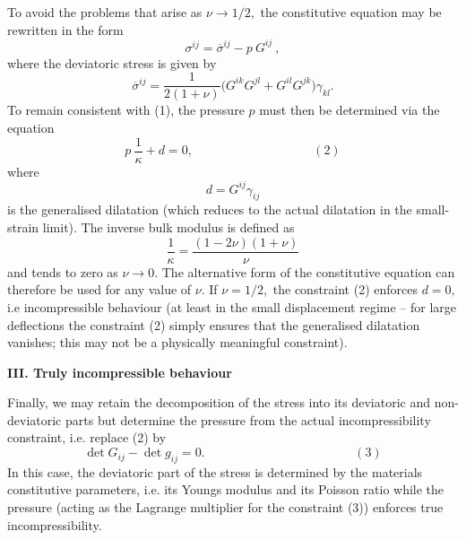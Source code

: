 To avoid the problems that arise as $ \nu \to 1/2, $ the constitutive equation may be rewritten in the form \[ \sigma^{ij} = \overline{\sigma}^{ij} - p \ G^{ij} \ , \] where the deviatoric stress is given by \[ \overline{\sigma}^{ij} = \frac{1}{2(1+\nu)} \bigg( G^{ik} G^{jl} + G^{il} G^{jk} \bigg) \gamma_{kl}. \] To remain consistent with (1), the pressure $ p $ must then be determined via the equation \[ p \ \frac{1}{\kappa} + d = 0, \hspace{4cm} (2) \] where \[ d = G^{ij} \gamma_{ij} \] is the generalised dilatation (which reduces to the actual dilatation in the small-\/strain limit). The inverse bulk modulus is defined as \[ \frac{1}{\kappa} = \frac{(1-2\nu)(1+\nu)}{\nu} \] and tends to zero as $ \nu \to 0. $ The alternative form of the constitutive equation can therefore be used for any value of $ \nu $. If $ \nu = 1/2, $ the constraint (2) enforces $ d=0, $ i.\+e incompressible behaviour (at least in the small displacement regime -- for large deflections the constraint (2) simply ensures that the generalised dilatation vanishes; this may not be a physically meaningful constraint).

{\bfseries  I\+II. Truly incompressible behaviour}

Finally, we may retain the decomposition of the stress into its deviatoric and non-\/deviatoric parts but determine the pressure from the actual incompressibility constraint, i.\+e. replace (2) by \[ \det G_{ij} - \det g_{ij} = 0. \hspace{5cm} (3) \] In this case, the deviatoric part of the stress is determined by the material\textquotesingle{}s constitutive parameters, i.\+e. its Young\textquotesingle{}s modulus and its Poisson ratio while the pressure (acting as the Lagrange multiplier for the constraint (3)) enforces true incompressibility.

\label{_disclaimer}%


